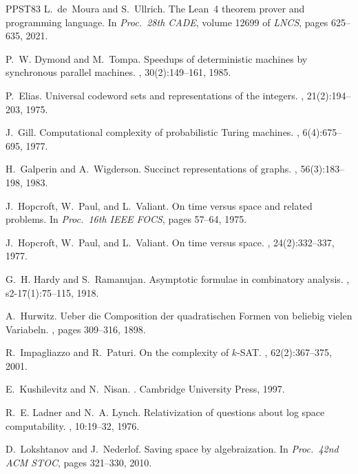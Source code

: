 \documentclass[11pt]{article}
\theoremstyle{definition}
\theoremstyle{definition}
\theoremstyle{remark}
\begin{document}
\begin{thebibliography}{PPST83}
L.~de~Moura and S.~Ullrich.
\newblock The {L}ean~4 theorem prover and programming language.
\newblock In {\em Proc.\ 28th CADE}, volume 12699 of {\em LNCS}, pages 625--635, 2021.

P.~W. Dymond and M.~Tompa.
\newblock Speedups of deterministic machines by synchronous parallel machines.
, 30(2):149--161, 1985.

P.~Elias.
\newblock Universal codeword sets and representations of the integers.
, 21(2):194--203, 1975.

J.~Gill.
\newblock Computational complexity of probabilistic {T}uring machines.
, 6(4):675--695, 1977.

H.~Galperin and A.~Wigderson.
\newblock Succinct representations of graphs.
, 56(3):183--198, 1983.

J.~Hopcroft, W.~Paul, and L.~Valiant.
\newblock On time versus space and related problems.
\newblock In {\em Proc.\ 16th IEEE FOCS}, pages 57--64, 1975.

J.~Hopcroft, W.~Paul, and L.~Valiant.
\newblock On time versus space.
, 24(2):332--337, 1977.

G.~H. Hardy and S.~Ramanujan.
\newblock Asymptotic formulae in combinatory analysis.
, s2-17(1):75--115, 1918.

A.~Hurwitz.
\newblock Ueber die {C}omposition der quadratischen {F}ormen von beliebig vielen {V}ariabeln.
, pages 309--316, 1898.

R.~Impagliazzo and R.~Paturi.
\newblock On the complexity of $k$-{SAT}.
, 62(2):367--375, 2001.

E.~Kushilevitz and N.~Nisan.
.
\newblock Cambridge University Press, 1997.

R.~E. Ladner and N.~A. Lynch.
\newblock Relativization of questions about log space computability.
, 10:19--32, 1976.

D.~Lokshtanov and J.~Nederlof.
\newblock Saving space by algebraization.
\newblock In {\em Proc.\ 42nd ACM STOC}, pages 321--330, 2010.


\end{thebibliography}
\end{document}
